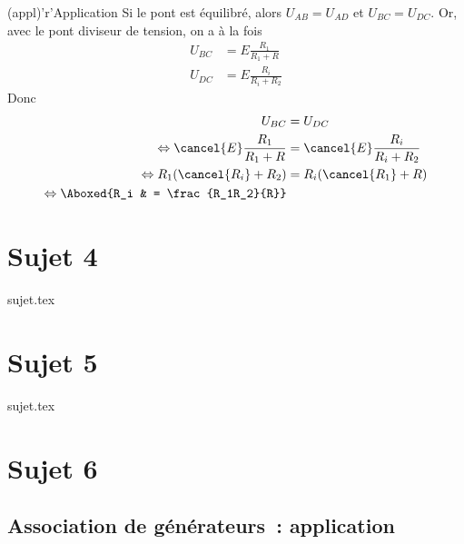 \documentclass[a4paper, 11pt]{book}
\begin{document}
{\begin{tcbraster}[raster columns=6, raster equal height=rows]
\begin{tcolorbox}[blankest, raster multicolumn=1, space to=\myspace]
\begin{tcbraster}[raster columns=1]
\begin{tcb}
				\end{tcb}
			\end{tcbraster}
		\end{tcolorbox}
		\begin{tcb}[raster multicolumn=3](appl)'r'{Application} Si le pont est
			équilibré, alors $U_{AB} = U_{AD}$ et $U_{BC} = U_{DC}$. Or, avec le
			pont diviseur de tension, on a à la fois
			\begin{align*}
				U_{BC} & = E \frac{R_1}{R_1+R}   \\
				U_{DC} & = E \frac{R_i}{R_i+R_2}
			\end{align*}
			Donc
			\begin{align*}
				U_{BC}                                & = U_{DC}                         \\
				\Leftrightarrow \cancel{E} \frac{R_1}{R_1+R}
				                                      & = \cancel{E} \frac{R_i}{R_i+R_2} \\
				\Leftrightarrow R_1(\cancel{R_i}+R_2) & = R_i(\cancel{R_1}+R)            \\
				\Leftrightarrow \Aboxed{R_i           & = \frac{R_1R_2}{R}}
			\end{align*}
		\end{tcb}
	\end{tcbraster}
}

\chapter{Sujet 4}

\resetQ
{sujet.tex}

\chapter{Sujet 5}

\resetQ
{sujet.tex}

\chapter{Sujet 6}

\resetQ
\section{Association de générateurs~: application}
\end{document}
